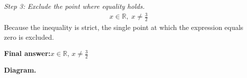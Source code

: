 \documentclass[11pt]{article}
\begin{document}
\textit{Step 3: Exclude the point where equality holds.}
\[\begin{gathered}
x \in \mathbb{R}, \; x \neq \tfrac{3}{2}
\end{gathered}\]
Because the inequality is strict, the single point at which the expression equals zero is excluded.

\begin{answerbox}
\textbf{Final answer:}\quad \(\displaystyle x \in \mathbb{R}\), \(\displaystyle x \neq \tfrac{3}{2}\)
\end{answerbox}
\textbf{Diagram.}

\begin{center}
\end{center}
\end{document}
